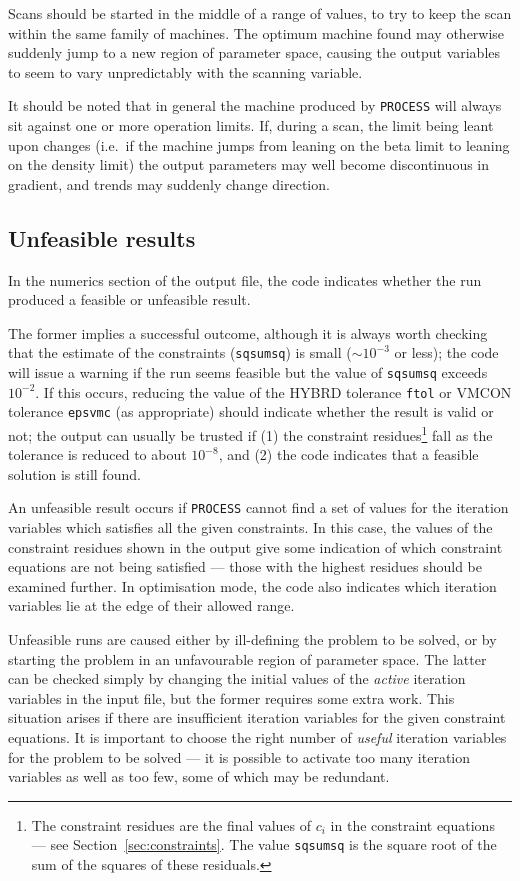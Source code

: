 \documentclass[11pt,a4paper]{report}
\newcommand{\process}{\mbox{\texttt{PROCESS}}}
\begin{document}
Scans should be started in the middle of a range of values, to try to keep the
scan within the same family of machines. The optimum machine found may
otherwise suddenly jump to a new region of parameter space, causing the output
variables to seem to vary unpredictably with the scanning variable.

It should be noted that in general the machine produced by \process\/ will
always sit against one or more operation limits. If, during a scan, the limit
being leant upon changes (i.e.\ if the machine jumps from leaning on the beta
limit to leaning on the density limit) the output parameters may well become
discontinuous in gradient, and trends may suddenly change direction.

\subsection{Unfeasible results}

In the numerics section of the output file, the code indicates whether the run
produced a feasible or unfeasible result.

The former implies a successful outcome, although it is always worth checking
that the estimate of the constraints (\texttt{sqsumsq}) is small ($\sim
10^{-3}$ or less); the code will issue a warning if the run seems feasible but
the value of \texttt{sqsumsq} exceeds $10^{-2}$. If this occurs, reducing the
value of the HYBRD tolerance \texttt{ftol} or VMCON tolerance \texttt{epsvmc}
(as appropriate) should indicate whether the result is valid or not; the
output can usually be trusted if (1) the constraint residues\footnote{The
  constraint residues are the final values of $c_i$ in the constraint
  equations --- see Section~\ref{sec:constraints}. The value \texttt{sqsumsq}
  is the square root of the sum of the squares of these residuals.} fall as
the tolerance is reduced to about $10^{-8}$, and (2) the code indicates that a
feasible solution is still found.

An unfeasible result occurs if \process\/ cannot find a set of values for the
iteration variables which satisfies all the given constraints. In this case,
the values of the constraint residues shown in the output give some indication
of which constraint equations are not being satisfied --- those with the
highest residues should be examined further. In optimisation mode, the code
also indicates which iteration variables lie at the edge of their allowed
range.

Unfeasible runs are caused either by ill-defining the problem to be solved, or
by starting the problem in an unfavourable region of parameter space. The
latter can be checked simply by changing the initial values of the
\textit{active}\/ iteration variables in the input file, but the former
requires some extra work. This situation arises if there are insufficient
iteration variables for the given constraint equations. It is important to
choose the right number of \textit{useful}\/ iteration variables for the
problem to be solved --- it is possible to activate too many iteration
variables as well as too few, some of which may be redundant.
\end{document}
